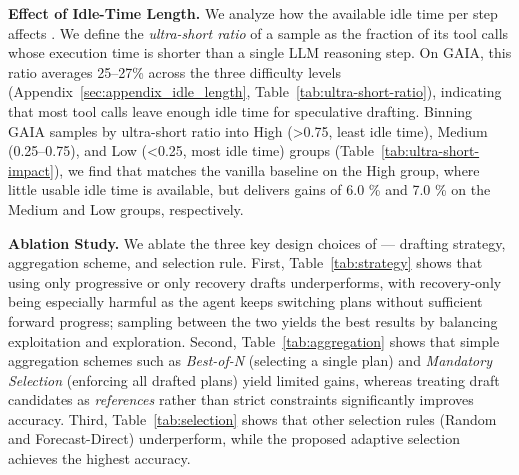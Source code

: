 \textbf{Effect of Idle-Time Length.}
We analyze how the available idle time per step affects \methodname{}.
We define the \emph{ultra-short ratio} of a sample as the fraction of its tool calls whose execution time is shorter than a single LLM reasoning step. On GAIA, this ratio averages 25--27\% across the three difficulty levels (Appendix~\ref{sec:appendix_idle_length}, Table~\ref{tab:ultra-short-ratio}), indicating that most tool calls leave enough idle time for speculative drafting. Binning GAIA samples by ultra-short ratio into High (>0.75, least idle time), Medium (0.25--0.75), and Low (<0.25, most idle time) groups (Table~\ref{tab:ultra-short-impact}), we find that \methodname{} matches the vanilla baseline on the High group, where little usable idle time is available,  but delivers gains of 6.0 \% and 7.0 \% on the Medium and Low groups, respectively.



\textbf{Ablation Study.}
We ablate the three key design choices of \methodname{} --- drafting strategy, aggregation scheme, and selection rule.
First, Table~\ref{tab:strategy} shows that using only progressive or only recovery drafts underperforms, with recovery-only being especially harmful as the agent keeps switching plans without sufficient forward progress; sampling between the two yields the best results by balancing exploitation and exploration.
Second, Table~\ref{tab:aggregation} shows that simple aggregation schemes such as \emph{Best-of-N} (selecting a single plan) and \emph{Mandatory Selection} (enforcing all drafted plans) yield limited gains, whereas treating draft candidates as \emph{references} rather than strict constraints significantly improves accuracy.
Third, Table~\ref{tab:selection} shows that other selection rules (Random and Forecast-Direct) underperform, while the proposed adaptive selection achieves the highest accuracy.
